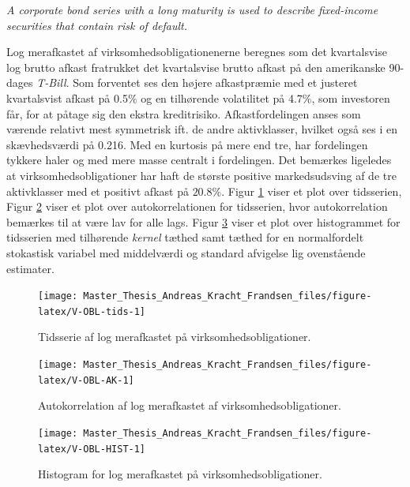 \documentclass[
  a4paper,
  oneside]{memoir}
\begin{document}
\begin{center}
\textit{A corporate bond series with a long maturity is used to describe fixed-income securities that contain risk of default.}
\end{center}

Log merafkastet af virksomhedsobligationenerne beregnes som det kvartalsvise log brutto afkast fratrukket det kvartalsvise brutto afkast på den amerikanske 90-dages \emph{T-Bill}. Som forventet ses den højere afkastpræmie med et justeret kvartalsvist afkast på 0.5\(\%\) og en tilhørende volatilitet på 4.7\(\%\), som investoren får, for at påtage sig den ekstra kreditrisiko. Afkastfordelingen anses som værende relativt mest symmetrisk ift. de andre aktivklasser, hvilket også ses i en skævhedsværdi på 0.216. Med en kurtosis på mere end tre, har fordelingen tykkere haler og med mere masse centralt i fordelingen. Det bemærkes ligeledes at virksomhedsobligationer har haft de største positive markedsudsving af de tre aktivklasser med et positivt afkast på \(20.8 \%\). Figur \ref{fig:V-OBL-tids} viser et plot over tidsserien, Figur \ref{fig:V-OBL-AK} viser et plot over autokorrelationen for tidsserien, hvor autokorrelation bemærkes til at være lav for alle lags. Figur \ref{fig:V-OBL-HIST} viser et plot over histogrammet for tidsserien med tilhørende \emph{kernel} tæthed samt tæthed for en normalfordelt stokastisk variabel med middelværdi og standard afvigelse lig ovenstående estimater.

\begin{figure}[H]

{\centering \texttt{[image: Master\_Thesis\_Andreas\_Kracht\_Frandsen\_files/figure-latex/V-OBL-tids-1]} 

}

\caption{Tidsserie af log merafkastet på virksomhedsobligationer.}\label{fig:V-OBL-tids}
\end{figure}

\begin{figure}[H]

{\centering \texttt{[image: Master\_Thesis\_Andreas\_Kracht\_Frandsen\_files/figure-latex/V-OBL-AK-1]} 

}

\caption{Autokorrelation af log merafkastet af virksomhedsobligationer.}\label{fig:V-OBL-AK}
\end{figure}

\begin{figure}[H]

{\centering \texttt{[image: Master\_Thesis\_Andreas\_Kracht\_Frandsen\_files/figure-latex/V-OBL-HIST-1]} 

}

\caption{Histogram for log merafkastet på virksomhedsobligationer.}\label{fig:V-OBL-HIST}
\end{figure}
\end{document}
